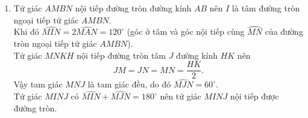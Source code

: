 \begin{bt}
{\begin{enumerate}
{   }
   {
   }
   \noindent
   \begin{eqnarray*}
    \cos \widehat{MAK}=\dfrac{AM}{AK} \Leftrightarrow \dfrac{AM}{AK}=\cos 60^\circ \Leftrightarrow \dfrac{AM}{AK}=\dfrac{1}{2}.
   \end{eqnarray*}
   Do đó $\dfrac{MN}{HK}=\dfrac{1}{2}$ hay $HK=2MN$.
   \item Tứ giác $AMBN$ nội tiếp đường tròn đường kính $AB$ nên $I$ là tâm đường tròn ngoại tiếp tứ giác $AMBN$.\\
   Khi đó $\widehat{MIN}=2\widehat{MAN}=120^\circ$ (góc ở tâm và góc nội tiếp cùng $\wideparen{MN}$ của đường tròn ngoại tiếp tứ giác $AMBN$).\\
   Tứ giác $MNKH$ nội tiếp đường tròn tâm $J$ đường kính $HK$ nên
   $$JM=JN=MN=\dfrac{HK}{2}.$$
   Vậy tam giác $MNJ$ là tam giác đều, do đó $\widehat{MJN}=60^\circ$.\\
   Tứ giác $MINJ$ có $\widehat{MIN}+\widehat{MJN}=180^\circ$ nên tứ giác $MINJ$ nội tiếp được đường tròn.
  \end{enumerate}
  }
\end{bt}

